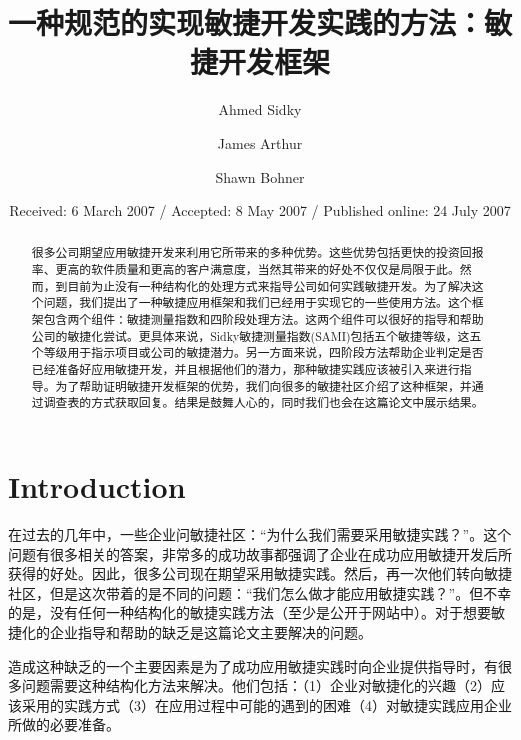 \documentclass[twocolumn]{svjour3}          %
\begin{document}
\title{一种规范的实现敏捷开发实践的方法：敏捷开发框架}

\author{Ahmed Sidky \and James Arthur \and Shawn Bohner}


\date{Received: 6 March 2007 / Accepted: 8 May 2007 / Published online: 24 July 2007}

\maketitle

\begin{abstract}
很多公司期望应用敏捷开发来利用它所带来的多种优势。这些优势包括更快的投资回报率、更高的软件质量和更高的客户满意度，当然其带来的好处不仅仅是局限于此。然而，到目前为止没有一种结构化的处理方式来指导公司如何实践敏捷开发。为了解决这个问题，我们提出了一种敏捷应用框架和我们已经用于实现它的一些使用方法。这个框架包含两个组件：敏捷测量指数和四阶段处理方法。这两个组件可以很好的指导和帮助公司的敏捷化尝试。更具体来说，Sidky敏捷测量指数(SAMI)包括五个敏捷等级，这五个等级用于指示项目或公司的敏捷潜力。另一方面来说，四阶段方法帮助企业判定是否已经准备好应用敏捷开发，并且根据他们的潜力，那种敏捷实践应该被引入来进行指导。为了帮助证明敏捷开发框架的优势，我们向很多的敏捷社区介绍了这种框架，并通过调查表的方式获取回复。结果是鼓舞人心的，同时我们也会在这篇论文中展示结果。
\end{abstract}

\section{Introduction}
\label{intro}
在过去的几年中，一些企业问敏捷社区：“为什么我们需要采用敏捷实践？”\cite{highsmith2006agile}。这个问题有很多相关的答案，非常多的成功故事都强调了企业在成功应用敏捷开发后所获得的好处\cite{barnett2006agile,barnett2004adopting,kuppuswami2003effects,law2005effects,schatz2005primavera,williams2000strengthening}。因此，很多公司现在期望采用敏捷实践。然后，再一次他们转向敏捷社区，但是这次带着的是不同的问题：“我们怎么做才能应用敏捷实践？”\cite{highsmith2006agile}。但不幸的是，没有任何一种结构化的敏捷实践方法（至少是公开于网站中）。对于想要敏捷化的企业指导和帮助的缺乏是这篇论文主要解决的问题。

造成这种缺乏的一个主要因素是为了成功应用敏捷实践时向企业提供指导时，有很多问题需要这种结构化方法来解决。他们包括：（1）企业对敏捷化的兴趣（2）应该采用的实践方式（3）在应用过程中可能的遇到的困难（4）对敏捷实践应用企业所做的必要准备。
\end{document}
